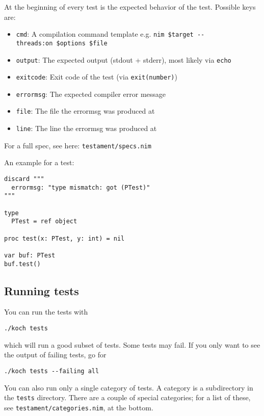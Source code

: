 At the beginning of every test is the expected behavior of the test.
Possible keys are:

\begin{itemize}
\tightlist
\item
  \texttt{cmd}: A compilation command template e.g.
  \texttt{nim\ \$target\ -\/-threads:on\ \$options\ \$file}
\item
  \texttt{output}: The expected output (stdout + stderr), most likely
  via \texttt{echo}
\item
  \texttt{exitcode}: Exit code of the test (via \texttt{exit(number)})
\item
  \texttt{errormsg}: The expected compiler error message
\item
  \texttt{file}: The file the errormsg was produced at
\item
  \texttt{line}: The line the errormsg was produced at
\end{itemize}

For a full spec, see here: \texttt{testament/specs.nim}

An example for a test:

\begin{verbatim}
discard """
  errormsg: "type mismatch: got (PTest)"
"""

type
  PTest = ref object

proc test(x: PTest, y: int) = nil

var buf: PTest
buf.test()
\end{verbatim}

\hypertarget{running-tests}{%
\subsection{Running tests}\label{running-tests}}

You can run the tests with

\begin{verbatim}
./koch tests
\end{verbatim}

which will run a good subset of tests. Some tests may fail. If you only
want to see the output of failing tests, go for

\begin{verbatim}
./koch tests --failing all
\end{verbatim}

You can also run only a single category of tests. A category is a
subdirectory in the \texttt{tests} directory. There are a couple of
special categories; for a list of these, see
\texttt{testament/categories.nim}, at the bottom.

